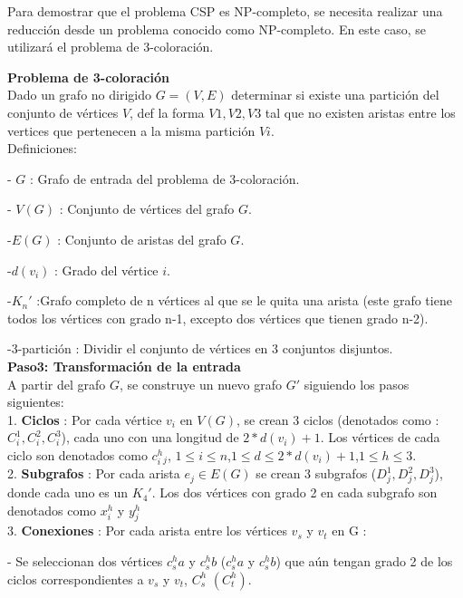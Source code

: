 \documentclass[
10pt, %
a4paper, %
oneside, %
headinclude,footinclude, %
BCOR5mm, %
]{scrartcl}
\begin{document}
Para demostrar que el problema CSP es NP-completo, se necesita realizar una reducción desde un problema conocido como NP-completo. 
En este caso, se utilizará el problema de 3-coloración.


\textbf{ Problema de 3-coloración} \\


Dado un grafo no dirigido $G = (V,E)$ determinar si existe una partición del conjunto de vértices $V$,
def la forma ${V1,V2,V3}$ tal que no existen aristas entre los vertices que pertenecen a la misma partición $Vi$.\\


Definiciones:

- $G$ : Grafo de entrada del problema de 3-coloración.

- $V(G)$ : Conjunto de vértices del grafo $G$.

-$E(G)$ : Conjunto de aristas del grafo $G$. 

-$d(v_i)$ : Grado del vértice $i$.

-$K_n'$ :Grafo completo de n vértices al que se le quita una arista (este grafo tiene todos los vértices con grado n-1, excepto dos vértices que tienen grado n-2).

-3-partición : Dividir el conjunto de vértices en 3 conjuntos disjuntos.\\



\textbf{Paso3: Transformación de la entrada  }\\

A partir del grafo $G$, se construye un nuevo grafo $G'$ siguiendo los pasos siguientes:\\

1. \textbf{Ciclos} : Por cada vértice $v_i$ en $V(G)$, se crean 3 ciclos (denotados como : $C^1_i, C^2_i, C^3_i$), 
cada uno con una longitud de $2*d(v_i) + 1$. Los vértices de cada ciclo son denotados como $c^h_i_j$, $1 \leq i \leq n$,$ 1 \leq d \leq 2*d(v_i) + 1$,$ 1 \leq h \leq 3 $.\\

2. \textbf{Subgrafos} : Por cada arista $e_j \in E(G)$ se crean 3 subgrafos ($D^1_j, D^2_j, D^3_j$), donde cada uno es un $K_4'$. Los dos vértices con grado 2 en cada 
subgrafo son denotados como $x^h_i$ y $y^h_j$\\

3. \textbf{Conexiones} : Por cada arista entre los vértices $v_s$ y $v_t$ en G :

- Se seleccionan dos vértices $c^h_sa$ y $c^h_sb$ ($c^h_sa$ y $c^h_sb$) que aún tengan grado 2 de los ciclos correspondientes a $v_s$ y $v_t$, $C^h_s$ $(C^h_t)$.
\end{document}
